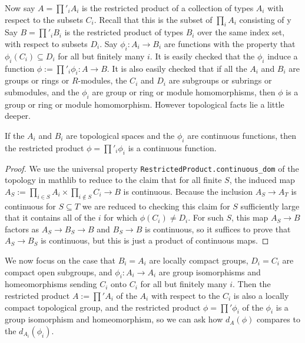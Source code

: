 Now say $A=\prod'_i A_i$ is the restricted product of a collection of types $A_i$
  with respect to the subsets $C_i$. Recall that this is the subset of $\prod_i A_i$
  consisting of y Say $B=\prod'_i B_i$ is the restricted
  product of types $B_i$ over the same index set, with respect to
  subsets $D_i$. Say $\phi_i:A_i\to B_i$ are functions
  with the property that $\phi_i(C_i)\subseteq D_i$ for all but finitely many $i$.
It is easily checked that the $\phi_i$ induce a function $\phi:=\prod'_i\phi_i:A\to B$. It is also easily
checked that if all the $A_i$ and $B_i$ are groups or rings or $R$-modules, the $C_i$ and $D_i$
are subgroups or subrings or submodules,
and the $\phi_i$ are group or ring or module homomorphisms, then $\phi$ is a group or ring or
module homomorphism. However topological facts lie a little deeper.

\begin{lemma}
  \label{Continuous.restrictedProduct_congrRight}
  \leanok
  If the $A_i$ and $B_i$ are topological spaces and the $\phi_i$ are continuous functions,
  then the restricted product $\phi = \prod'_i\phi_i$ is a continuous function.
\end{lemma}
\begin{proof}
  \leanok
  We use the universal property {\tt RestrictedProduct.continuous\_dom} of the
  topology in mathlib to reduce to the claim that for all finite $S$,
  the induced map $A_S:=\prod_{i\in S}A_i\times\prod_{i\notin S}C_i\to B$ is continuous.
  Because the inclusion $A_S\to A_T$ is continuous for $S\subseteq T$ we are reduced
  to checking this claim for $S$ sufficiently large that it contains all of the $i$
  for which $\phi(C_i)\not=D_i$. For such $S$, this map $A_S\to B$ factors as $A_S\to B_S\to B$
  and $B_S\to B$ is continuous, so it suffices to prove that $A_S\to B_S$ is continuous, but
  this is just a product of continuous maps.
\end{proof}

We now focus on the case that $B_i=A_i$ are locally compact groups, $D_i=C_i$ are compact
open subgroups, and $\phi_i:A_i\to A_i$ are group isomorphisms and homeomorphisms sending
$C_i$ onto $C_i$ for all but finitely many $i$. Then the restricted product $A:=\prod'A_i$
of the $A_i$ with respect to the $C_i$ is also a locally compact topological group, and the
restricted product $\phi=\prod'\phi_i$ of the $\phi_i$ is a group isomorphism and homeomorphism,
so we can ask how $d_A(\phi)$ compares to the $d_{A_i}(\phi_i)$.

